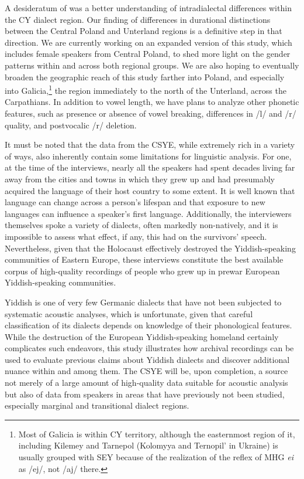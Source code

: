 \documentclass[output=paper,colorlinks,citecolor=brown]{langscibook}
\begin{document}
A desideratum of \citet{SadockMasor2018} was a better understanding of intradialectal differences within the CY dialect region. Our finding of differences in durational distinctions between the Central Poland and Unterland regions is a definitive step in that direction. We are currently working on an expanded version of this study, which includes female speakers from Central Poland, to shed more light on the gender patterns within and across both regional groups. We are also hoping to eventually broaden the geographic reach of this study farther into Poland, and especially into Galicia,\footnote{Most of Galicia is within CY territory, although the easternmost region of it, including Kilemey and Tarnepol (Kolomyya and Ternopil' in Ukraine) is usually grouped with SEY because of the realization of the reflex of MHG \textit{ei} as \mbox{/ej/}, not \mbox{/aj/} there.}  the region immediately to the north of the Unterland, across the Carpathians. In addition to vowel length, we have plans to analyze other phonetic features, such as presence or absence of vowel breaking, differences in \mbox{/l/} and \mbox{/r/} quality, and postvocalic \mbox{/r/} deletion. 

It must be noted that the data from the CSYE, while extremely rich in a variety of ways, also inherently contain some limitations for linguistic analysis. For one, at the time of the interviews, nearly all the speakers had spent decades living far away from the cities and towns in which they grew up and had presumably acquired the language of their host country to some extent. It is well known that language can change across a person's lifespan and that exposure to new languages can influence a speaker's first language. Additionally, the interviewers themselves spoke a variety of dialects, often markedly non-natively, and it is impossible to assess what effect, if any, this had on the survivors' speech. Nevertheless, given that the Holocaust effectively destroyed the Yiddish\hyp speaking communities of Eastern Europe, these interviews constitute the best available corpus of high-quality recordings of people who grew up in prewar European Yiddish\hyp speaking communities.

Yiddish is one of very few Germanic dialects that have not been subjected to systematic acoustic analyses, which is unfortunate, given that careful classification of its dialects depends on knowledge of their phonological features. While the destruction of the European Yiddish\hyp speaking homeland certainly complicates such endeavors, this study illustrates how archival recordings can be used to evaluate previous claims about Yiddish dialects and discover additional nuance within and among them. The CSYE will be, upon completion, a source not merely of a large amount of high-quality data suitable for acoustic analysis but also of data from speakers in areas that have previously not been studied, especially marginal and transitional dialect regions. 
\end{document}
